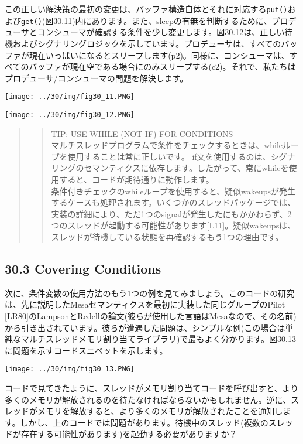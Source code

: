 この正しい解決策の最初の変更は、バッファ構造自体とそれに対応する\texttt{put()}および\texttt{get()}(図30.11)内にあります。また、sleepの有無を判断するために、プロデューサとコンシューマが確認する条件を少し変更します。図30.12は、正しい待機およびシグナリングロジックを示しています。プロデューサは、すべてのバッファが現在いっぱいになるとスリープします(p2)。同様に、コンシューマは、すべてのバッファが現在空である場合にのみスリープする(c2)。それで、私たちはプロデューサ/コンシューマの問題を解決します。

\texttt{[image: ../30/img/fig30\_11.PNG]}

\texttt{[image: ../30/img/fig30\_12.PNG]}

\begin{quote}
\begin{quote}
TIP: USE WHILE (NOT IF) FOR CONDITIONS\\
マルチスレッドプログラムで条件をチェックするときは、whileループを使用することは常に正しいです。
if文を使用するのは、シグナリングのセマンティクスに依存します。したがって、常にwhileを使用すると、コードが期待通りに動作します。\\
条件付きチェックのwhileループを使用すると、疑似wakeupsが発生するケースも処理されます。いくつかのスレッドパッケージでは、実装の詳細により、ただ1つのsignalが発生したにもかかわらず、2つのスレッドが起動する可能性があります{[}L11{]}。疑似wakeupsは、スレッドが待機している状態を再確認するもう1つの理由です。
\end{quote}
\end{quote}

\hypertarget{covering-conditions}{%
\subsection*{30.3 Covering Conditions}\label{covering-conditions}}

次に、条件変数の使用方法のもう1つの例を見てみましょう。このコードの研究は、先に説明したMesaセマンティクスを最初に実装した同じグループのPilot
{[}LR80{]}のLampsonとRedellの論文(彼らが使用した言語はMesaなので、その名前)から引き出されています。彼らが遭遇した問題は、シンプルな例(この場合は単純なマルチスレッドメモリ割り当てライブラリ)で最もよく分かります。図30.13に問題を示すコードスニペットを示します。

\texttt{[image: ../30/img/fig30\_13.PNG]}

コードで見てきたように、スレッドがメモリ割り当てコードを呼び出すと、より多くのメモリが解放されるのを待たなければならないかもしれません。逆に、スレッドがメモリを解放すると、より多くのメモリが解放されたことを通知します。しかし、上のコードでは問題があります。待機中のスレッド(複数のスレッドが存在する可能性があります)を起動する必要がありますか？

